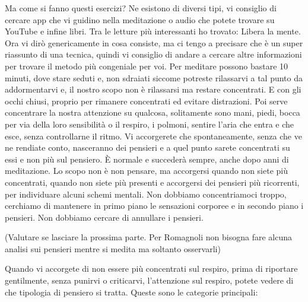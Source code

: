 \documentclass[12pt]{book} %
\begin{document}
Ma come si fanno questi esercizi? Ne esistono di diversi tipi, vi consiglio di cercare app che vi guidino nella
meditazione o audio che potete trovare su YouTube e infine libri. Tra le letture più interessanti ho trovato: Libera la
mente. Ora vi dirò
genericamente in cosa consiste, ma ci tengo a precisare che è un super riassunto di una tecnica, quindi vi consiglio di
andare a cercare altre informazioni per trovare il metodo più congeniale per voi. Per meditare possono bastare 10
minuti, dove stare seduti e, non sdraiati siccome potreste rilassarvi a tal punto da addormentarvi e, il nostro scopo
non è rilassarsi ma restare concentrati. E con gli occhi chiusi, proprio per rimanere concentrati ed evitare
distrazioni. Poi serve concentrare la nostra attenzione su qualcosa, solitamente sono mani, piedi, bocca per via della
loro sensibilità o il respiro, i polmoni, sentire l'aria che entra e che esce, senza controllarne
il ritmo. Vi accorgerete che spontaneamente, senza che ve ne rendiate conto, nasceranno dei pensieri e a quel punto
sarete concentrati su essi e non più sul pensiero. È normale e succederà sempre, anche dopo anni di meditazione. Lo
scopo non è non pensare, ma accorgersi quando non siete più concentrati, quando non siete più presenti e accorgersi dei
pensieri più ricorrenti, per individuare alcuni schemi mentali. Non dobbiamo concentriamoci troppo, cerchiamo di mantenere in primo piano le sensazioni corporee e in secondo piano i pensieri. Non dobbiamo cercare di annullare i pensieri.

(Valutare se lasciare la prossima parte. Per Romagnoli non bisogna fare alcuna analisi sui pensieri mentre si medita ma
soltanto osservarli)

Quando vi accorgete di non essere più concentrati sul respiro, prima di riportare gentilmente, senza punirvi o
criticarvi, l'attenzione sul respiro, potete vedere di che tipologia di pensiero si tratta. Queste
sono le categorie principali:
\end{document}
